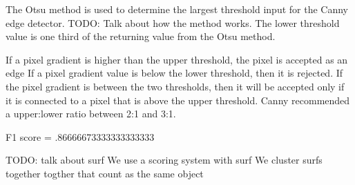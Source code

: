 \documentclass[a4paper]{article}
\begin{document}
The Otsu method is used to determine the largest threshold input for the Canny
edge detector.  TODO: Talk about how the method works.  The lower threshold
value is one third of the returning value from the Otsu method.

If a pixel gradient is higher than the upper threshold, the pixel is accepted
as an edge If a pixel gradient value is below the lower threshold, then it is
rejected.  If the pixel gradient is between the two thresholds, then it will be
accepted only if it is connected to a pixel that is above the upper threshold.
Canny recommended a upper:lower ratio between 2:1 and 3:1.

F1 score = .86666673333333333333

TODO: talk about surf
We use a scoring system with surf
We cluster surfs together togther that count as the same object
\end{document}
